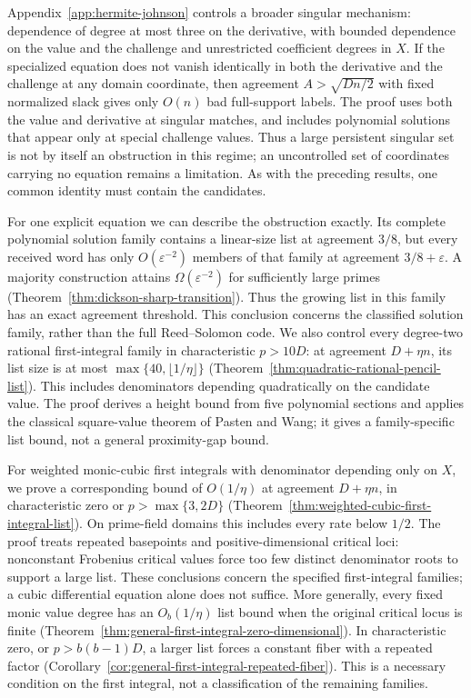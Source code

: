 \documentclass[11pt,letterpaper]{article}
\theoremstyle{definition}
\theoremstyle{remark}
\begin{document}
Appendix~\ref{app:hermite-johnson} controls a broader singular mechanism:
dependence of degree at most three on the derivative, with bounded dependence on the
value and the challenge and unrestricted coefficient degrees in $X$.
If the specialized equation does not vanish identically in both the
derivative and the challenge at any domain coordinate, then agreement
$A>\sqrt{Dn/2}$ with fixed normalized slack gives only $O(n)$ bad
full-support labels. The proof uses both the value and derivative at
singular matches, and includes polynomial solutions that appear only
at special challenge values. Thus a large persistent singular set is
not by itself an obstruction in this regime; an uncontrolled set of
coordinates carrying no equation remains a limitation. As with the
preceding results, one common identity must contain the candidates.

For one explicit equation we can describe the obstruction exactly.
Its complete polynomial solution family contains a linear-size list at
agreement $3/8$, but every received word has only
$O(\varepsilon^{-2})$ members of that family at agreement
$3/8+\varepsilon$. A majority construction attains
$\Omega(\varepsilon^{-2})$ for sufficiently large primes
(Theorem~\ref{thm:dickson-sharp-transition}). Thus the growing list in
this family has an exact agreement threshold. This conclusion concerns
the classified solution family, rather than the full Reed--Solomon code.
We also control every degree-two rational first-integral family in
characteristic $p>10D$: at agreement $D+\eta n$, its list size is at most
$\max\{40,\lfloor1/\eta\rfloor\}$
(Theorem~\ref{thm:quadratic-rational-pencil-list}).
This includes denominators depending quadratically on the candidate
value. The proof derives a height bound from five polynomial sections
and applies the classical square-value theorem of Pasten and Wang;
it gives a family-specific list bound, not a general proximity-gap bound.

For weighted monic-cubic first integrals with denominator depending only
on $X$, we prove a corresponding bound of $O(1/\eta)$ at agreement
$D+\eta n$, in characteristic zero or $p>\max\{3,2D\}$
(Theorem~\ref{thm:weighted-cubic-first-integral-list}).  On prime-field
domains this includes every rate below $1/2$.  The proof treats repeated
basepoints and positive-dimensional critical loci: nonconstant Frobenius
critical values force too few distinct denominator roots to support a
large list.  These conclusions concern the specified first-integral
families; a cubic differential equation alone does not suffice.
More generally, every fixed monic value degree has an $O_b(1/\eta)$
list bound when the original critical locus is finite
(Theorem~\ref{thm:general-first-integral-zero-dimensional}). In
characteristic zero, or $p>b(b-1)D$, a larger list forces a constant
fiber with a repeated factor
(Corollary~\ref{cor:general-first-integral-repeated-fiber}). This is a
necessary condition on the first integral, not a classification of the
remaining families.
\end{document}
